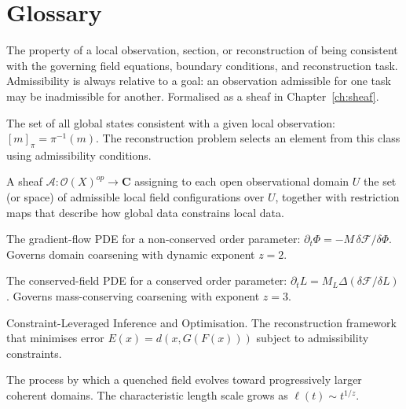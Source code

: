 
\chapter*{Glossary}

\begin{description}[leftmargin=2.5cm, style=nextline]

\item[Admissibility]
  The property of a local observation, section, or reconstruction
  of being consistent with the governing field equations,
  boundary conditions, and reconstruction task.
  Admissibility is always relative to a goal: an observation
  admissible for one task may be inadmissible for another.
  Formalised as a sheaf in Chapter~\ref{ch:sheaf}.

\item[Admissibility class]
  The set of all global states consistent with a given local
  observation: $[m]_\pi = \pi^{-1}(m)$.
  The reconstruction problem selects an element from this class
  using admissibility conditions.

\item[Admissibility sheaf]
  A sheaf $\mathcal{A} : \mathcal{O}(X)^{op} \to \mathbf{C}$
  assigning to each open observational domain $U$ the set (or
  space) of admissible local field configurations over $U$,
  together with restriction maps that describe how global data
  constrains local data.

\item[Allen--Cahn equation]
  The gradient-flow PDE for a non-conserved order parameter:
  $\partial_t \Phi = -M\,\delta\mathcal{F}/\delta\Phi$.
  Governs domain coarsening with dynamic exponent $z=2$.

\item[Cahn--Hilliard equation]
  The conserved-field PDE for a conserved order parameter:
  $\partial_t L = M_L \Delta (\delta\mathcal{F}/\delta L)$.
  Governs mass-conserving coarsening with exponent $z=3$.

\item[CLIO]
  Constraint-Leveraged Inference and Optimisation.
  The reconstruction framework that minimises error
  $E(x) = d(x, G(F(x)))$ subject to admissibility constraints.

\item[Coarsening]
  The process by which a quenched field evolves toward
  progressively larger coherent domains.
  The characteristic length scale grows as
  $\ell(t) \sim t^{1/z}$.


\end{description}
